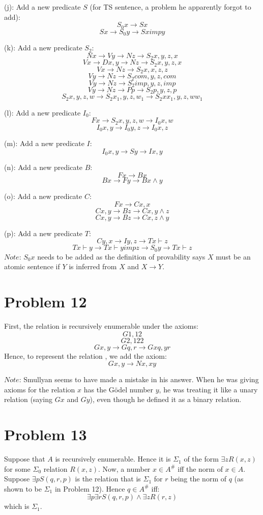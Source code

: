 \documentclass{article}
\theoremstyle{definition}
\begin{document}
(j): Add a new predicate $S$ (for TS sentence, a problem he apparently forgot to add): \[ S_0x\rightarrow Sx \] \[ Sx\rightarrow S_0y\rightarrow Sximpy \]



(k): Add a new predicate $S_2$: \[ Nx\rightarrow Vy\rightarrow Nz\rightarrow S_2x,y,z,x \] \[ Vx\rightarrow Dx,y\rightarrow Nz\rightarrow S_2x,y,z,x \]
\[ Vx\rightarrow Nz\rightarrow S_2x,x,z,z \] \[ Vy\rightarrow Nz\rightarrow S_2com,y,z,com \] \[ Vy\rightarrow Nz\rightarrow S_2imp,y,z,imp \]
\[ Vy\rightarrow Nz\rightarrow Pp\rightarrow S_2p,y,z,p \] \[ S_2x,y,z,w\rightarrow S_2x_1,y,z,w_1\rightarrow S_2xx_1,y,z,ww_1 \] 


(l): Add a new predicate $I_0$: \[ Fx\rightarrow S_2x,y,z,w\rightarrow I_0x,w \] \[ I_0x,y\rightarrow I_0y,z\rightarrow I_0x,z \]


(m): Add a new predicate $I$: \[ I_0x,y\rightarrow Sy\rightarrow Ix,y \]


(n): Add a new predicate $B$: \[ Fx\rightarrow Bx \] \[ Bx\rightarrow Fy\rightarrow Bx\wedge y \]


(o): Add a new predicate $C$: \[ Fx\rightarrow Cx,x \] \[ Cx,y\rightarrow Bz\rightarrow Cx,y\wedge z \] \[ Cx,y\rightarrow Bz\rightarrow Cx,z\wedge y \]


(p): Add a new predicate $T$: \[ Cy,x\rightarrow Iy,z\rightarrow Tx\vdash z \] \[ Tx\vdash y\rightarrow Tx\vdash yimpz\rightarrow S_0y\rightarrow Tx\vdash z \]  
$Note$: $S_0x$ needs to be added as the definition of provability says $X$ must be an atomic sentence if $Y$ is inferred from $X$ and $X\rightarrow Y$.

\section*{Problem 12}
First, the relation  is recursively enumerable under the axioms:
\[ G1,12 \] \[ G2,122 \] \[ Gx,y\rightarrow Gq,r\rightarrow Gxq,yr \]
Hence, to represent the relation , we add the axiom:
\[ Gx,y\rightarrow Nx,xy \]


$Note$: Smullyan seems to have made a mistake in his answer. When he was giving axioms for the relation $x$ has the Gödel number $y$, he was treating it like a unary relation
(saying $Gx$ and $Gy$), even though he defined it as a binary relation.

\section*{Problem 13}
Suppose that $A$ is recursively enumerable. Hence it is $\Sigma_1$ of the form $\exists zR\left(x,z\right)$ for some $\Sigma_0$ relation $R\left(x,z\right)$. 
Now, a number $x\in A^\#$ iff the norm of $x\in A$. Suppose $\exists pS\left(q,r,p\right)$ is the relation that is $\Sigma_1$ for 
$r$ being the norm of $q$ (as shown to be $\Sigma_1$ in Problem 12). Hence $q\in A^\#$ iff:
\[ \exists p\exists rS\left(q,r,p\right)\wedge\exists zR\left(r,z\right) \] which is $\Sigma_1$.
\end{document}
